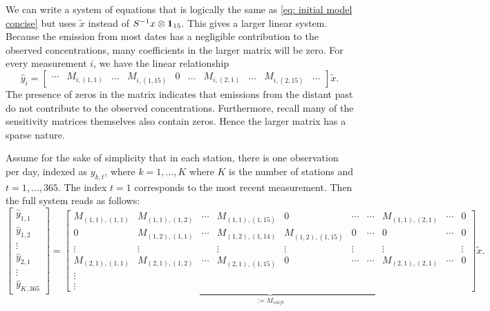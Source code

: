\documentclass{article}
\begin{document}
We can write a system of equations that is logically the same as \cref{eq: initial model concise} but uses $\tilde{x}$ instead of $S^{-1} x \otimes \vb{1}_{15}$. This gives a larger linear system. Because the emission from most dates has a negligible contribution to the observed concentrations, many coefficients in the larger matrix will be zero. For every measurement $i$, we have the linear relationship
$$
        \hat{y}_i
    =
    \begin{bmatrix}
        \cdots & M_{i,(1,1)} & \dots & M_{i,(1,15)} & 0 & \dots & M_{i,(2,1)} & \dots & M_{i,(2,15)} & \dots
    \end{bmatrix}
    \tilde{x}
.$$
The presence of zeros in the matrix indicates that emissions from the distant past do not contribute to the observed concentrations. Furthermore, recall many of the sensitivity matrices themselves also contain zeros. Hence the larger matrix has a sparse nature.

Assume for the sake of simplicity that in each station, there is one observation per day, indexed as $y_{k,t}$, where $k = 1,\dots,K$ where $K$ is the number of stations and $t = 1,\dots,365$. The index $t=1$ corresponds to the most recent measurement. Then the full system reads as follows:
\begin{equation}
    \label{eq: initial model 365 days}
\begin{bmatrix}
    \hat{y}_{1,1} \\
    \hat{y}_{1,2} \\
    \vdots \\
    \hat{y}_{2,1} \\ 
    \vdots \\
    \hat{y}_{K,365}
\end{bmatrix}
=
\underbrace{
\begin{bmatrix}
    M_{(1,1), (1,1)} & M_{(1,1), (1,2)} & \cdots & M_{(1,1),(1,15)} & 0 & \cdots & \cdots & M_{(1,1), (2,1)} & \cdots & 0 \\
    0 & M_{(1,2), (1,1)} & \cdots & M_{(1,2), (1,14)} & M_{(1,2), (1,15)} & 0 & \cdots & 0 & \cdots & 0 \\
    \vdots & \vdots & & \vdots & \vdots & \vdots & & \vdots & & \vdots \\
    M_{(2,1), (1,1)} & M_{(2,1), (1,2)} & \cdots & M_{(2,1),(1,15)} & 0 & \cdots & \cdots & M_{(2,1), (2,1)} & \cdots & 0 \\
    \vdots \\
    \vdots
\end{bmatrix}
}_{ := M_{shift}}
\tilde{x}
.\end{equation}
\end{document}
